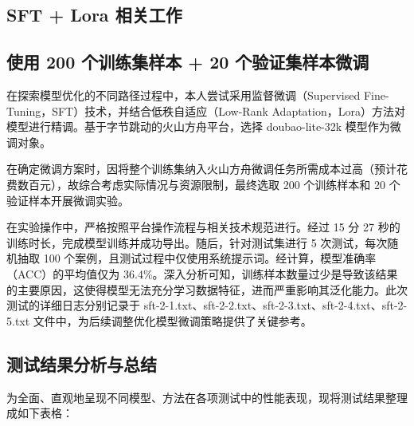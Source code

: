 \documentclass[10.5pt,compsoc]{CjC}
\theoremstyle{mystyle}
\begin{document}
\begin{CJK*}{UTF8}{zhhei}
\section{SFT + Lora 相关工作}
\subsection{使用 200 个训练集样本 + 20 个验证集样本微调}
在探索模型优化的不同路径过程中，本人尝试采用监督微调（Supervised Fine-Tuning，SFT）技术，并结合低秩自适应（Low-Rank Adaptation，Lora）方法对模型进行精调。基于字节跳动的火山方舟平台，选择 doubao-lite-32k 模型作为微调对象。

在确定微调方案时，因将整个训练集纳入火山方舟微调任务所需成本过高（预计花费数百元），故综合考虑实际情况与资源限制，最终选取 200 个训练样本和 20 个验证样本开展微调实验。

在实验操作中，严格按照平台操作流程与相关技术规范进行。经过 15 分 27 秒的训练时长，完成模型训练并成功导出。随后，针对测试集进行 5 次测试，每次随机抽取 100 个案例，且测试过程中仅使用系统提示词。经计算，模型准确率（ACC）的平均值仅为 36.4\%。深入分析可知，训练样本数量过少是导致该结果的主要原因，这使得模型无法充分学习数据特征，进而严重影响其泛化能力。此次测试的详细日志分别记录于 sft-2-1.txt、sft-2-2.txt、sft-2-3.txt、sft-2-4.txt、sft-2-5.txt 文件中，为后续调整优化模型微调策略提供了关键参考。

\subsection{测试结果分析与总结}
为全面、直观地呈现不同模型、方法在各项测试中的性能表现，现将测试结果整理成如下表格：


\end{CJK*}
\end{document}
